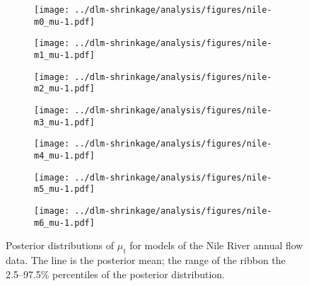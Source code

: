 \begin{figure}[htpb!]
  \centering
  \begin{subfigure}[b]{0.5\linewidth}
    \texttt{[image: ../dlm-shrinkage/analysis/figures/nile-m0\_mu-1.pdf]}
    \caption{}
  \end{subfigure}%
  \begin{subfigure}[b]{0.5\linewidth}
    \texttt{[image: ../dlm-shrinkage/analysis/figures/nile-m1\_mu-1.pdf]}
    \caption{}
  \end{subfigure}
  \begin{subfigure}[b]{0.5\linewidth}
    \texttt{[image: ../dlm-shrinkage/analysis/figures/nile-m2\_mu-1.pdf]}    
    \caption{}
  \end{subfigure}%
  \begin{subfigure}[b]{0.5\linewidth}
    \texttt{[image: ../dlm-shrinkage/analysis/figures/nile-m3\_mu-1.pdf]}
    \caption{}
  \end{subfigure}
  \begin{subfigure}[b]{0.5\linewidth}
    \texttt{[image: ../dlm-shrinkage/analysis/figures/nile-m4\_mu-1.pdf]}    
    \caption{}
  \end{subfigure}%
  \begin{subfigure}[b]{0.5\linewidth}
    \texttt{[image: ../dlm-shrinkage/analysis/figures/nile-m5\_mu-1.pdf]}
    \caption{}
  \end{subfigure}
  \begin{subfigure}[b]{0.5\linewidth}
    \texttt{[image: ../dlm-shrinkage/analysis/figures/nile-m6\_mu-1.pdf]}    
    \caption{}
  \end{subfigure}
  \caption[Posterior distributions of $\mu_t$ for models of the Nile River annual flow data.]{Posterior distributions of $\mu_t$ for models of the Nile River annual flow data. The line is the posterior mean; the range of the ribbon the 2.5--97.5\% percentiles of the posterior distribution.}
  \label{dlm:fig:nile_mu_posterior}
\end{figure}


